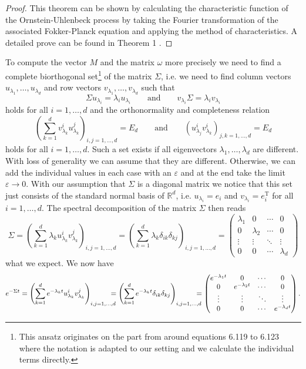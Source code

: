 \documentclass[11pt,titlepage]{article}
\newcommand{\R}{\mathbb{R}} %
\theoremstyle{definition}
\theoremstyle{remark}
\begin{document}
	\begin{proof}
		This theorem can be shown by calculating the characteristic function of the 
		Ornstein-Uhlenbeck process by taking the Fourier transformation of the 
		associated Fokker-Planck equation and applying the method of characteristics. 
		A detailed prove can be found in Theorem 1 \cite{Vatiwutipong2019}.
	\end{proof}
	
	To compute the vector $M$ and the matrix $\omega$ more precisely we need to find a complete biorthogonal set\footnote{This ansatz originates on the part from \cite{Risken1996} around equations 6.119 to 6.123 where the notation is adapted to our setting and we calculate the individual terms directly.} of 
	the matrix $\Sigma$, i.e. we need to find column vectors $u_{\lambda_1},\ldots,u_{\lambda_d}$ and row vectors $v_{\lambda_1},\ldots,v_{\lambda_d}$ such that
	\[\Sigma u_{\lambda_i}=\lambda_i u_{\lambda_i}\qquad \text{and} \qquad
	v_{\lambda_i}\Sigma=\lambda_i v_{\lambda_i}\]
	holds for all $i=1,\ldots,d$ and the orthonormality and completeness relation
	\[\left(\sum_{k=1}^d v_{\lambda_k}^i u_{\lambda_k}^j\right)_{i,j=1,\ldots,d}=E_d\qquad 
	\text{and} \qquad \left(u_{\lambda_j}^i v_{\lambda_k}^i\right)_{j,k=1,\ldots,d} = E_d\]
	holds for all $i=1,\ldots,d$. Such a set exists if all eigenvectors $\lambda_1,\ldots,\lambda_d$ are different. With loss of generality we can assume that they are different. Otherwise, we can add the individual values in each case with an $\varepsilon$ and at the end take the limit $\varepsilon\to 0$. With our assumption that $\Sigma$ is a diagonal matrix we notice that this set just consists of the standard normal basis of $\R^d$, i.e. 
	$u_{\lambda_i}=e_i$ and $v_{\lambda_i}=e_i^{\text{T}}$ for all $i=1,\ldots,d$. 
	The spectral decomposition of the matrix $\Sigma$ then reads
	\[\Sigma = \left(\sum_{k=1}^d \lambda_k u_{\lambda_k}^i v_{\lambda_k}^j\right)_{i,j=1,\ldots,d}=\left(\sum_{k=1}^d \lambda_k \delta_{ik}\delta_{kj}\right)_{i,j=1,\ldots,d} = 
	\begin{pmatrix}
		\lambda_1 & 0 &\cdots & 0 \\
		0 & \lambda_2 & \cdots & 0 \\
		\vdots & \vdots & \ddots & \vdots \\
		0 & 0 & \cdots & \lambda_d
	\end{pmatrix}\]
	what we expect. We now have 
	\begin{align*}
		e^{-\Sigma t} = \left(\sum_{k=1}^d e^{-\lambda_k t}u_{\lambda_k}^i v_{\lambda_k}^j\right)_{i,j=1,\ldots,d}
		\hspace{-1em}=\left(\sum_{k=1}^d e^{-\lambda_k t}\delta_{ik}\delta_{kj}\right)_{i,j=1,\ldots,d}
		\hspace{-1em}= 
		\begin{pmatrix}
			e^{-\lambda_1 t} & 0 &\cdots & 0 \\
			0 & e^{-\lambda_2 t} & \cdots & 0 \\
			\vdots & \vdots & \ddots & \vdots \\
			0 & 0 & \cdots & e^{-\lambda_d t}
		\end{pmatrix}.
	\end{align*}
\end{document}
